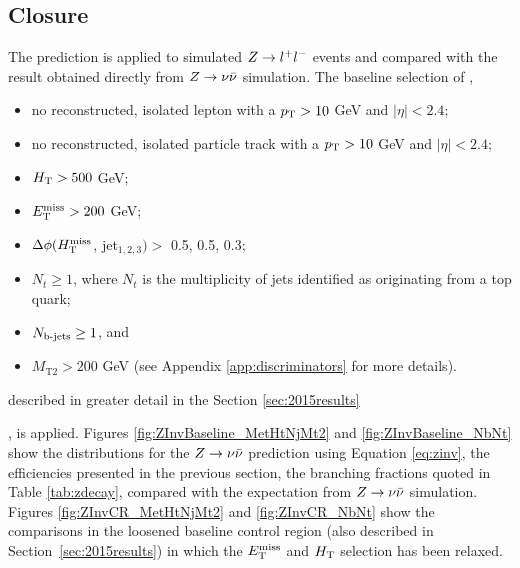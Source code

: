 {\subsection{Closure}
The prediction is applied to simulated $Z\rightarrow l^+l^-$ events and compared with the result obtained directly from $Z\rightarrow \nu\bar{\nu}$ simulation. The baseline selection of \cite{Khachatryan:2016kdk}, 
\begin{itemize}
\item no reconstructed, isolated lepton with a $p_{\text{T}}>10$ GeV and $|\eta|<2.4$;
\item no reconstructed, isolated particle track with a $p_{\text{T}}>10$ GeV and $|\eta|<2.4$;
\item $H_{\rm T}>500$ GeV;
\item $E_{\text{T}}^{\rm miss}>200$ GeV;
\item $\Delta\phi(H_{\text{T}}^{\rm miss}$, jet$_{1,2,3})>$ 0.5, 0.5, 0.3;
\item $N_t\geq1$, where $N_t$ is the multiplicity of jets identified as originating from a top quark;
\item $N_{\text{b-jets}}\geq1$, and
\item $M_{\text{T2}}>200$ GeV (see Appendix \ref{app:discriminators} for more details).
\end{itemize}
described in greater detail in the Section \ref{sec:2015results}}, is applied. Figures \ref{fig:ZInvBaseline_MetHtNjMt2} and \ref{fig:ZInvBaseline_NbNt} show the distributions for the $Z\rightarrow \nu\bar{\nu}$ prediction using Equation \ref{eq:zinv}, the efficiencies presented in the previous section, the branching fractions quoted in Table \ref{tab:zdecay}, compared with the expectation from $Z\rightarrow \nu\bar{\nu}$ simulation. Figures \ref{fig:ZInvCR_MetHtNjMt2} and \ref{fig:ZInvCR_NbNt} show the comparisons in the loosened baseline control region (also described in Section~\ref{sec:2015results}) in which the $E_{\text{T}}^{\rm miss}$ and $H_{\rm T}$ selection has been relaxed.
